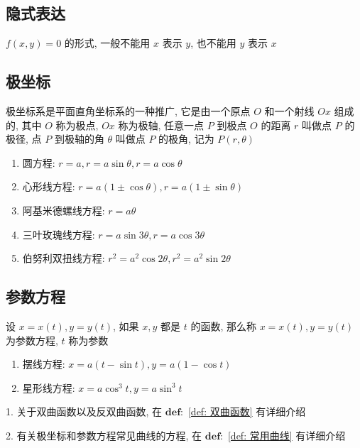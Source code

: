 \subsection{隐式表达}
\begin{definition}[隐式表达]
	$f(x,y) = 0$ 的形式, 一般不能用 $x$ 表示 $y$, 也不能用 $y$ 表示 $x$
\end{definition}
\subsection{极坐标}
\begin{definition}[极坐标]
	极坐标系是平面直角坐标系的一种推广, 它是由一个原点 $O$ 和一个射线 $Ox$ 组成的, 其中 $O$ 称为极点, $Ox$ 称为极轴, 任意一点 $P$ 到极点 $O$ 的距离 $r$ 叫做点 $P$ 的极径, 点 $P$ 到极轴的角 $\theta$ 叫做点 $P$ 的极角, 记为 $P(r,\theta)$
\end{definition}

\begin{definition}[重要极坐标方程]
	\begin{enumerate}
		\item 圆方程: $r = a, r = a\sin\theta, r = a\cos\theta$
		\item 心形线方程: $r = a(1\pm \cos\theta), r = a(1\pm \sin\theta)$
		\item 阿基米德螺线方程: $r = a\theta$
		\item 三叶玫瑰线方程: $r = a\sin 3\theta, r = a\cos 3\theta$
		\item 伯努利双扭线方程: $r^{2} = a^{2}\cos 2\theta, r^{2} = a^{2}\sin 2\theta$
	\end{enumerate}
\end{definition}
\subsection{参数方程}
\begin{definition}[参数方程]
	设 $x=x(t),y=y(t)$, 如果 $x,y$ 都是 $t$ 的函数, 那么称 $x=x(t),y=y(t)$ 为参数方程, $t$ 称为参数
\end{definition}
\begin{definition}[重要参数方程]
	\begin{enumerate}
		\item 摆线方程: $x = a(t-\sin t), y = a(1-\cos t)$
		\item 星形线方程: $x = a\cos^{3} t, y = a\sin^{3} t$
	\end{enumerate}
\end{definition}

\begin{anymark}[注]
	1. 关于双曲函数以及反双曲函数, 在 $\mathbf{def:}$ \ref{def: 双曲函数} 有详细介绍
	
	2. 有关极坐标和参数方程常见曲线的方程, 在 $\mathbf{def:}$ \ref{def: 常用曲线} 有详细介绍 
\end{anymark}




